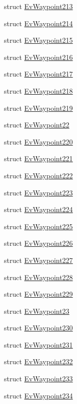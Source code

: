 \begin{DoxyCompactItemize}
struct \hyperlink{structsmacc_1_1EvWaypoint213}{Ev\+Waypoint213}
\item 
struct \hyperlink{structsmacc_1_1EvWaypoint214}{Ev\+Waypoint214}
\item 
struct \hyperlink{structsmacc_1_1EvWaypoint215}{Ev\+Waypoint215}
\item 
struct \hyperlink{structsmacc_1_1EvWaypoint216}{Ev\+Waypoint216}
\item 
struct \hyperlink{structsmacc_1_1EvWaypoint217}{Ev\+Waypoint217}
\item 
struct \hyperlink{structsmacc_1_1EvWaypoint218}{Ev\+Waypoint218}
\item 
struct \hyperlink{structsmacc_1_1EvWaypoint219}{Ev\+Waypoint219}
\item 
struct \hyperlink{structsmacc_1_1EvWaypoint22}{Ev\+Waypoint22}
\item 
struct \hyperlink{structsmacc_1_1EvWaypoint220}{Ev\+Waypoint220}
\item 
struct \hyperlink{structsmacc_1_1EvWaypoint221}{Ev\+Waypoint221}
\item 
struct \hyperlink{structsmacc_1_1EvWaypoint222}{Ev\+Waypoint222}
\item 
struct \hyperlink{structsmacc_1_1EvWaypoint223}{Ev\+Waypoint223}
\item 
struct \hyperlink{structsmacc_1_1EvWaypoint224}{Ev\+Waypoint224}
\item 
struct \hyperlink{structsmacc_1_1EvWaypoint225}{Ev\+Waypoint225}
\item 
struct \hyperlink{structsmacc_1_1EvWaypoint226}{Ev\+Waypoint226}
\item 
struct \hyperlink{structsmacc_1_1EvWaypoint227}{Ev\+Waypoint227}
\item 
struct \hyperlink{structsmacc_1_1EvWaypoint228}{Ev\+Waypoint228}
\item 
struct \hyperlink{structsmacc_1_1EvWaypoint229}{Ev\+Waypoint229}
\item 
struct \hyperlink{structsmacc_1_1EvWaypoint23}{Ev\+Waypoint23}
\item 
struct \hyperlink{structsmacc_1_1EvWaypoint230}{Ev\+Waypoint230}
\item 
struct \hyperlink{structsmacc_1_1EvWaypoint231}{Ev\+Waypoint231}
\item 
struct \hyperlink{structsmacc_1_1EvWaypoint232}{Ev\+Waypoint232}
\item 
struct \hyperlink{structsmacc_1_1EvWaypoint233}{Ev\+Waypoint233}
\item 
struct \hyperlink{structsmacc_1_1EvWaypoint234}{Ev\+Waypoint234}

\end{DoxyCompactItemize}
